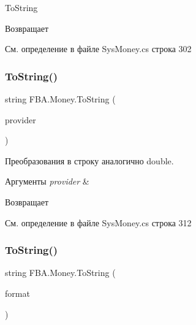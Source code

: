 To\+String 

\begin{DoxyReturn}{Возвращает}

\end{DoxyReturn}


См. определение в файле Sys\+Money.\+cs строка 302

\mbox{\label{struct_f_b_a_1_1_money_a38711699bdc67a8203f6f3861acfe325}} 
\subsubsection{\texorpdfstring{To\+String()}{ToString()}\hspace{0.1cm}{\footnotesize\ttfamily [2/4]}}
{\footnotesize\ttfamily string F\+B\+A.\+Money.\+To\+String (\begin{DoxyParamCaption}\item[{I\+Format\+Provider}]{provider }\end{DoxyParamCaption})}



Преобразования в строку аналогично double. 


\begin{DoxyParams}{Аргументы}
{\em provider} & \\
\hline
\end{DoxyParams}
\begin{DoxyReturn}{Возвращает}

\end{DoxyReturn}


См. определение в файле Sys\+Money.\+cs строка 312

\mbox{\label{struct_f_b_a_1_1_money_ab246a3547382e0df4bdbf2ae08bc9adb}} 
\subsubsection{\texorpdfstring{To\+String()}{ToString()}\hspace{0.1cm}{\footnotesize\ttfamily [3/4]}}
{\footnotesize\ttfamily string F\+B\+A.\+Money.\+To\+String (\begin{DoxyParamCaption}\item[{string}]{format }\end{DoxyParamCaption})}



